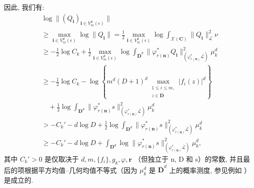 因此, 我们有:
\[ \begin{split} 
&\log \|(Q_{\mathbf{i}})_{\mathbf{i} \in V_m^d(\epsilon)}\| \\ 
&\geq \max_{\mathbf{i} \in V_m^d(\epsilon)} \log \|Q_{\mathbf{i}}\| = \frac{1}{2} \max_{\mathbf{i} \in V_m^d(\epsilon)} \log \int_{\mathcal{X}(\mathbf{C})} \|Q_{\mathbf{i}}\|_{\mathcal{L}}^2 \nu \\ 
&\geq -\frac{1}{2} \log C_k + \frac{1}{2} \max_{\mathbf{i} \in V_m^d(\epsilon)} \log \int_{\overline{\mathbf{D}}^d} \|\varphi_{r(\mathbf{n})}^* Q_{\mathbf{i}}\|_{(\varphi_{r(\mathbf{n})}^* \overline{\mathcal{L}})}^2 \mu_k^d \\ 
&\geq -\frac{1}{2} \log C_k - \log \left\{ m^d (D+1)^d \max_{\substack{1 \leq i \leq m, \\ z \in \overline{\mathbf{D}}}} |f_i(z)|^d \right\} \\
&\quad + \frac{1}{2} \log \int_{\mathbf{D}^d} \|\varphi_{r(\mathbf{n})}^* s\|_{(\varphi_{r(\mathbf{n})}^* \overline{\mathcal{L}})}^2 \mu_k^d \\ 
&> -C_k' - d \log D + \frac{1}{2} \log \int_{\mathbf{D}^d} \|\varphi_{r(\mathbf{n})}^* s\|_{(\varphi_{r(\mathbf{n})}^* \overline{\mathcal{L}})}^2 \mu_k^d \\ 
&\geq -C_k' - d \log D + \int_{\mathbf{D}^d} \log \|\varphi_{r(\mathbf{n})}^* s\|_{(\varphi_{r(\mathbf{n})}^* \overline{\mathcal{L}})}^2 \mu_k^d, 
\end{split} \]
其中 \(C_k' > 0\) 是仅取决于 \(d, m, \{f_i\}, g_k, \varphi, \mathbf{r}\) （但独立于 n, D 和 s）的常数, 
并且最后的项根据平方均值--几何均值不等式（因为 \(\mu_k^d\) 是 \(\overline{\mathbf{D}}^d\) 上的概率测度, 
参见例如 \cite[(1.4.10)]{BGS94}）是成立的.

